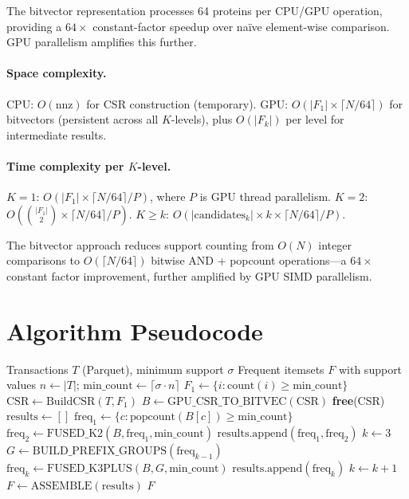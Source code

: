 \documentclass[10pt,a4paper,twocolumn]{article}
\begin{document}
The bitvector representation processes 64 proteins per CPU/GPU operation, providing a $64\times$ constant-factor speedup over na\"ive element-wise comparison. GPU parallelism amplifies this further.

\paragraph{Space complexity.}
CPU: $O(\text{nnz})$ for CSR construction (temporary). GPU: $O(|F_1| \times \lceil N/64 \rceil)$ for bitvectors (persistent across all $K$-levels), plus $O(|F_k|)$ per level for intermediate results.

\paragraph{Time complexity per $K$-level.}
$K{=}1$: $O(|F_1| \times \lceil N/64 \rceil / P)$, where $P$ is GPU thread parallelism.
$K{=}2$: $O(\binom{|F_1|}{2} \times \lceil N/64 \rceil / P)$.
$K{\geq}k$: $O(|\text{candidates}_k| \times k \times \lceil N/64 \rceil / P)$.

The bitvector approach reduces support counting from $O(N)$ integer comparisons to $O(\lceil N/64 \rceil)$ bitwise AND + popcount operations---a $64\times$ constant factor improvement, further amplified by GPU SIMD parallelism.

\section{Algorithm Pseudocode}
\label{app:pseudocode}

\begin{algorithm}[H]
\caption{ET-miner GPU-Accelerated Apriori}
\label{alg:etminer}
\begin{algorithmic}[1]
\Require Transactions $T$ (Parquet), minimum support $\sigma$
\Ensure Frequent itemsets $F$ with support values
\State $n \gets |T|$; $\text{min\_count} \gets \lceil \sigma \cdot n \rceil$
\State $F_1 \gets \{i : \text{count}(i) \geq \text{min\_count}\}$ 
\State $\text{CSR} \gets \text{BuildCSR}(T, F_1)$ 
\State $B \gets \text{GPU\_CSR\_TO\_BITVEC}(\text{CSR})$ 
\State \textbf{free}(CSR)
\State $\text{results} \gets []$
\State $\text{freq}_1 \gets \{c : \text{popcount}(B[c]) \geq \text{min\_count}\}$
\State $\text{freq}_2 \gets \text{FUSED\_K2}(B, \text{freq}_1, \text{min\_count})$
\State $\text{results.append}(\text{freq}_1, \text{freq}_2)$
\State $k \gets 3$
    \State $G \gets \text{BUILD\_PREFIX\_GROUPS}(\text{freq}_{k-1})$ 
    \State $\text{freq}_k \gets \text{FUSED\_K3PLUS}(B, G, \text{min\_count})$
    \State $\text{results.append}(\text{freq}_k)$ 
    \State $k \gets k + 1$
\EndWhile
\State $F \gets \text{ASSEMBLE}(\text{results})$ 
\State \Return $F$
\end{algorithmic}
\end{algorithm}
\end{document}
